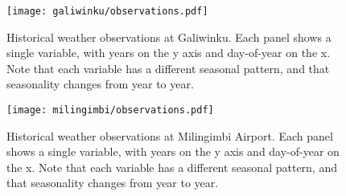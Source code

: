 \newcommand{\ObservationMultipanels}{
\begin{figure}[p]
    \centering
    \texttt{[image: galiwinku/observations.pdf]}
    \caption[Historical weather observations at Galiwinku]{
        Historical weather observations at Galiwinku.  Each panel shows
        a single variable, with years on the y axis and day-of-year on
        the x.  Note that each variable has a different seasonal pattern,
        and that seasonality changes from year to year.}
    \label{fig:galiwinku-observations}
\end{figure}
\begin{figure}[p]
    \centering
    \texttt{[image: milingimbi/observations.pdf]}
    \caption[Historical weather observations at Milingimbi Airport]{
        Historical weather observations at Milingimbi Airport.  Each panel shows
        a single variable, with years on the y axis and day-of-year on
        the x.  Note that each variable has a different seasonal pattern,
        and that seasonality changes from year to year.}
    \label{fig:milingimbi-observations}
\end{figure}
}

\checkoddpage\ifoddpage\ObservationMultipanels\fi

